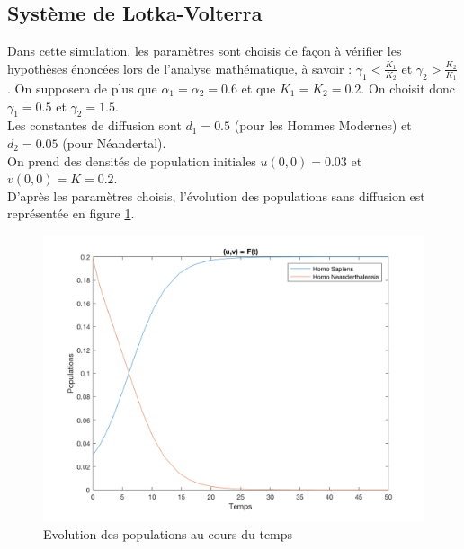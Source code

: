 \documentclass[a4paper,11pt]{article}
\begin{document}
\subsection{Système de Lotka-Volterra}

Dans cette simulation, les paramètres sont choisis de façon à vérifier les hypothèses énoncées lors de l'analyse mathématique, à savoir : $\gamma_1 < \frac{K_1}{K_2}$ et $\gamma_2 > \frac{K_2}{K_1}$. On supposera de plus que $\alpha_1 = \alpha_2 = 0.6$ et que $K_1 = K_2 = 0.2$. On choisit donc $\gamma_1 = 0.5$ et $\gamma_2 = 1.5$.\\
Les constantes de diffusion sont $d_1 = 0.5$ (pour les Hommes Modernes) et $d_2 = 0.05$ (pour Néandertal).\\
On prend des densités de population initiales $u(0,0) = 0.03$ et $v(0,0) = K = 0.2$.\\

D'après les paramètres choisis, l'évolution des populations sans diffusion est représentée en figure
\ref{pop}.

\begin{figure}[H]
\centering
\includegraphics[scale=0.3]{Comp/pop.png}
\caption{Evolution des populations au cours du temps}
\label{pop}
\end{figure}
\end{document}
